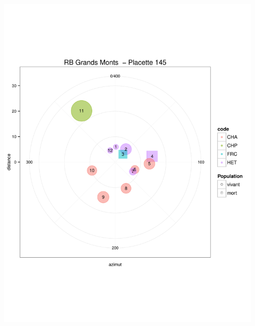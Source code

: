 \documentclass[a4paper]{book}\usepackage[]{graphicx}\usepackage[]{color}
\makeatletter
\def\maxwidth{ %
  \ifdim\Gin@nat@width>\linewidth
    \linewidth
  \else
    \Gin@nat@width
  \fi
}
\newenvironment{knitrout}{}{} %
\makeatother
\begin{document}
\begin{knitrout}
{\centering \includegraphics[width=\maxwidth]{Figures/PlanArbres-12} 

}





\end{knitrout}
\end{document}
